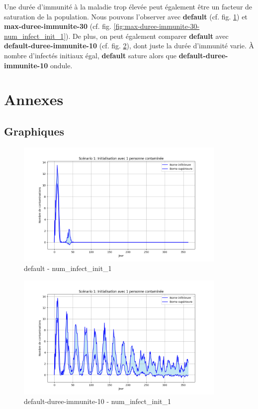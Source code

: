 \documentclass[12pt,french,titlepage]{article}
\begin{document}
Une durée d'immunité à la maladie trop élevée peut également être un facteur de saturation de la population. Nous pouvons l'observer avec \textbf{default} (cf. fig. \ref{fig:default-num_infect_init_1}) et \textbf{max-duree-immunite-30} (cf. fig. \ref{fig:max-duree-immunite-30-num_infect_init_1}). De plus, on peut également comparer \textbf{default} avec \textbf{default-duree-immunite-10} (cf. fig. \ref{fig:default-duree-immunite-10-num_infect_init_1}), dont juste la durée d'immunité varie. À nombre d'infectés initiaux égal, \textbf{default} sature alors que \textbf{default-duree-immunite-10} ondule.  

\newpage

\section{Annexes}

\subsection{Graphiques}
\begin{figure}[H]
    \centering
    \includegraphics[width=0.9\textwidth]{graphiques/default/num_infect_init_1.png}
    \caption{default - num\_infect\_init\_1}
    \label{fig:default-num_infect_init_1}
\end{figure}

\begin{figure}[H]
    \centering
    \includegraphics[width=0.9\textwidth]{graphiques/default-duree-immunite-10/num_infect_init_1.png}
    \caption{default-duree-immunite-10 - num\_infect\_init\_1}
    \label{fig:default-duree-immunite-10-num_infect_init_1}
\end{figure} 
\end{document}
